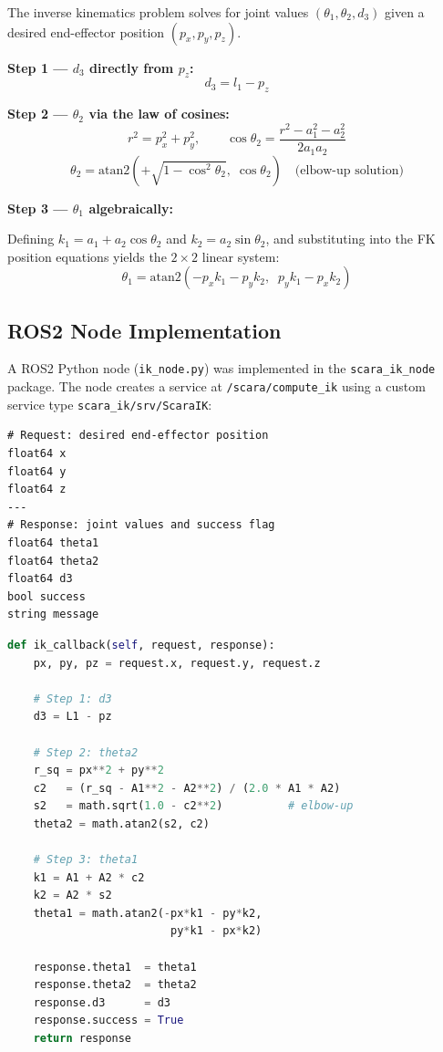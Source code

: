 \documentclass[12pt]{article}
\begin{document}
The inverse kinematics problem solves for joint values $(\theta_1, \theta_2, d_3)$
given a desired end-effector position $(p_x, p_y, p_z)$.

\textbf{Step 1 --- $d_3$ directly from $p_z$:}
\[
d_3 = l_1 - p_z
\]

\textbf{Step 2 --- $\theta_2$ via the law of cosines:}
\[
r^2 = p_x^2 + p_y^2, \qquad
\cos\theta_2 = \frac{r^2 - a_1^2 - a_2^2}{2 a_1 a_2}
\]
\[
\theta_2 = \text{atan2}\!\left(+\sqrt{1 - \cos^2\theta_2},\; \cos\theta_2\right)
\quad \text{(elbow-up solution)}
\]

\textbf{Step 3 --- $\theta_1$ algebraically:}

Defining $k_1 = a_1 + a_2\cos\theta_2$ and $k_2 = a_2\sin\theta_2$, and
substituting into the FK position equations yields the $2\times2$ linear system:
\[
\theta_1 = \text{atan2}\!\left(-p_x k_1 - p_y k_2,\;\; p_y k_1 - p_x k_2\right)
\]

\subsection{ROS2 Node Implementation}

A ROS2 Python node (\texttt{ik\_node.py}) was implemented in the
\texttt{scara\_ik\_node} package. The node creates a service at
\texttt{/scara/compute\_ik} using a custom service type
\texttt{scara\_ik/srv/ScaraIK}:

\begin{lstlisting}[style=ros, caption={ScaraIK.srv service definition}]
# Request: desired end-effector position
float64 x
float64 y
float64 z
---
# Response: joint values and success flag
float64 theta1
float64 theta2
float64 d3
bool success
string message
\end{lstlisting}

\begin{lstlisting}[style=ros, language=Python, caption={IK solver (ik\_node.py excerpt)}]
def ik_callback(self, request, response):
    px, py, pz = request.x, request.y, request.z

    # Step 1: d3
    d3 = L1 - pz

    # Step 2: theta2
    r_sq = px**2 + py**2
    c2   = (r_sq - A1**2 - A2**2) / (2.0 * A1 * A2)
    s2   = math.sqrt(1.0 - c2**2)          # elbow-up
    theta2 = math.atan2(s2, c2)

    # Step 3: theta1
    k1 = A1 + A2 * c2
    k2 = A2 * s2
    theta1 = math.atan2(-px*k1 - py*k2,
                         py*k1 - px*k2)

    response.theta1  = theta1
    response.theta2  = theta2
    response.d3      = d3
    response.success = True
    return response
\end{lstlisting}
\end{document}
